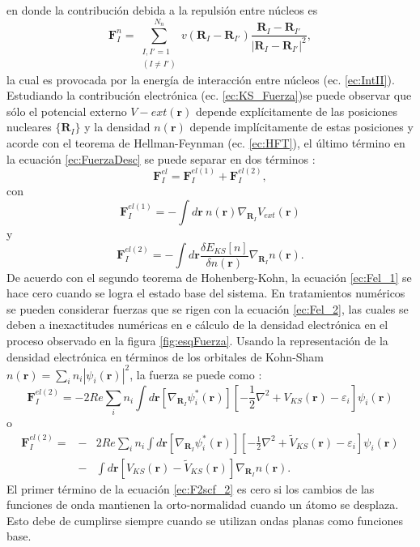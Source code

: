    en donde  la contribuci\'on debida a la repulsi\'on entre n\'ucleos es
   \begin{equation}
   \pmb{F}_I^n = \sum_{\substack{I,I' = 1 \\ (I \not = I')}}^{N_n} v(\pmb{R}_I - \pmb{R}_{I'}) \frac{\pmb{R}_I - \pmb{R}_{I'}}{|\pmb{R}_I - \pmb{R}_{I'}|^2}, 
   \end{equation}
   la cual es provocada por la energ\'ia de interacci\'on entre n\'ucleos (ec. \ref{ec:IntII}). Estudiando la contribuci\'on electr\'onica  (ec. \ref{ec:KS_Fuerza})se puede observar que s\'olo el potencial externo $V-{ext} (\pmb{r})$ depende expl\'icitamente de las posiciones nucleares $\{\pmb{R}_I\}$ y  la densidad $n(\pmb{r})$ depende impl\'icitamente de estas posiciones y acorde con el teorema de Hellman-Feynman (ec. \ref{ec:HFT}),  el \'ultimo t\'ermino en la ecuaci\'on \ref{ec:FuerzaDesc} se puede separar en dos t\'erminos \cite{doi:10.1080/00018738700101042}:
   \begin{equation}
   \pmb{F}_I^{el} = \pmb{F}_I^{el (1)} + \pmb{F}_I^{el (2)} \label{ec:descFel},
   \end{equation} 
   con
   \begin{equation}
   \pmb{F}_I^{el (1)} = - \int d \pmb{r} ~n(\pmb{r}) \nabla_{\pmb{R}_I} V_{ext} (\pmb{r}) \label{ec:Fel_1}
   \end{equation}
   y
   \begin{equation}
   \pmb{F}_I^{el(2)} = - \int d \pmb{r} \frac{\delta E_{KS} [n]}{\delta n(\pmb{r})} \nabla_{\pmb{R}_I} n(\pmb{r}). \label{ec:Fel_2} 
   \end{equation}
   De acuerdo con el segundo teorema de Hohenberg-Kohn, la ecuaci\'on \ref{ec:Fel_1} se hace cero cuando se logra el estado base del sistema. En tratamientos num\'ericos se pueden considerar fuerzas que se rigen con la ecuaci\'on \ref{ec:Fel_2}, las cuales se deben a inexactitudes num\'ericas en e c\'alculo de la densidad electr\'onica en el proceso observado en la figura \ref{fig:esqFuerza}. Usando la representaci\'on de la densidad electr\'onica en t\'erminos de los orbitales de Kohn-Sham $n(\pmb{r}) = \sum_i n_i |\psi_i (\pmb{r})|^2 $, la fuerza se puede como \cite{MB-2015}:
   \begin{equation}
   \pmb{F}_I^{el(2)} = -2 Re \sum_i n_i \int d \pmb{r} [\nabla_{\pmb{R}_I} \psi_i^* (\pmb{r})] \left[-\frac{1}{2} \nabla^2 + V_{KS} (\pmb{r}) - \varepsilon_i \right] \psi_i (\pmb{r}) \label{ec:F2scf}
   \end{equation}
   o
   \begin{eqnarray}
   \pmb{F}_I^{el(2)} = &-& 2 Re \sum_i n_i \int d \pmb{r} [\nabla_{\pmb{R}_I} \psi_i^* (\pmb{r})] \left[-\frac{1}{2} \nabla^2 + \tilde{V}_{KS} (\pmb{r}) -\varepsilon_i \right] \psi_i (\pmb{r}) \nonumber\\ 
   &-& \int d\pmb{r} [V_{KS} (\pmb{r})-\tilde{V}_{KS} (\pmb{r})] \nabla_{\pmb{R}_I} n(\pmb{r}). \label{ec:F2scf_2} 
   \end{eqnarray}
    El primer t\'ermino de la ecuaci\'on \ref{ec:F2scf_2} es cero si los cambios de las funciones de onda mantienen la orto-normalidad cuando un \'atomo se desplaza. Esto debe de cumplirse siempre cuando se utilizan  ondas planas como funciones base. 
      
